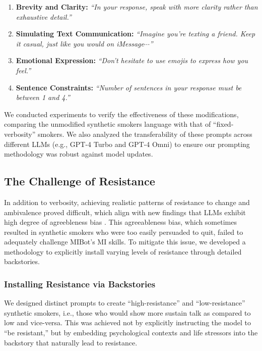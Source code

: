 \begin{enumerate}
    \item \textbf{Brevity and Clarity:} \textit{``In your response, speak with more clarity rather than exhaustive detail.''}

    \item \textbf{Simulating Text Communication:} \textit{``Imagine you're texting a friend. Keep it casual, just like you would on iMessage$\cdots$''}

    \item \textbf{Emotional Expression:} \textit{``Don't hesitate to use emojis to express how you feel.''}

    \item \textbf{Sentence Constraints:} \textit{``Number of sentences in your response must be between 1 and 4.''}
\end{enumerate}

We conducted experiments to verify the effectiveness of these modifications, comparing the unmodified synthetic smokers language with that of ``fixed-verbosity'' smokers. We also analyzed the transferability of these prompts across different LLMs (e.g., GPT-4 Turbo and GPT-4 Omni) to ensure our prompting methodology was robust against model updates.

\subsection{The Challenge of Resistance}
In addition to verbosity, achieving realistic patterns of resistance to change and ambivalence proved difficult, which align with new findings that LLMs exhibit high degree of agreebleness bias \cite{Salecha_2024}. This agreeableness bias, which sometimes resulted in synthetic smokers who were too easily persuaded to quit, failed to adequately challenge MIBot's MI skills. To mitigate this issue, we developed a methodology to explicitly install varying levels of resistance through detailed backstories.

\subsubsection*{Installing Resistance via Backstories}
We designed distinct prompts to create ``high-resistance'' and ``low-resistance'' synthetic smokers, i.e., those who would show more sustain talk as compared to low and vice-versa. This was achieved not by explicitly instructing the model to ``be resistant,'' but by embedding psychological contexts and life stressors into the backstory that naturally lead to resistance.

